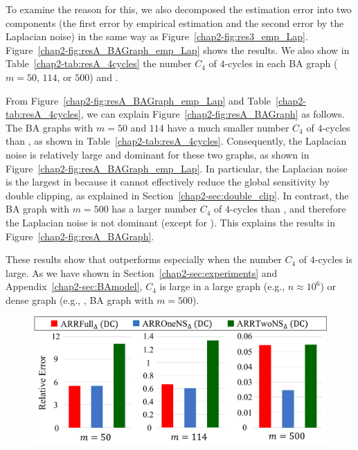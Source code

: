 {To examine the reason for this, we also decomposed the estimation error into two components (the first error by empirical estimation and the second error by the Laplacian noise) in the same way as Figure~\ref{chap2-fig:res3_emp_Lap}.
Figure~\ref{chap2-fig:resA_BAGraph_emp_Lap} shows the results.
We also show in Table~\ref{chap2-tab:resA_4cycles} the number $C_4$ of $4$-cycles in each BA graph ($m=50$, $114$, or $500$) and \GPlus{}.

From Figure~\ref{chap2-fig:resA_BAGraph_emp_Lap} and Table~\ref{chap2-tab:resA_4cycles}, we can explain Figure~\ref{chap2-fig:resA_BAGraph} as follows.
The BA graphs with $m=50$ and $114$ have a much smaller number $C_4$ of $4$-cycles than \GPlus{}, as shown in Table~\ref{chap2-tab:resA_4cycles}.
Consequently,
the Laplacian noise is relatively large and dominant for these two graphs, as shown in Figure~\ref{chap2-fig:resA_BAGraph_emp_Lap}.
In particular,
the Laplacian noise is the largest in \AlgThree{} because it cannot effectively reduce the global sensitivity by double clipping, as explained in Section~\ref{chap2-sec:double_clip}.
In contrast, the BA graph with $m=500$ has a larger number $C_4$ of $4$-cycles than \GPlus{}, and therefore the Laplacian noise is not dominant (except for \AlgThree{}).
This explains the results in Figure~\ref{chap2-fig:resA_BAGraph}.

These results
show that \AlgTwo{} outperforms \AlgOne{} especially when the number $C_4$ of $4$-cycles is large.
As we have shown in Section~\ref{chap2-sec:experiments} and Appendix~\ref{chap2-sec:BAmodel}, $C_4$ is large in a large graph (e.g., $n \approx 10^6$) or dense graph (e.g., \GPlus{}, BA graph with $m=500$).

\begin{figure}[t]
  \centering
  \includegraphics[width=0.99\linewidth]{fig/resA_BAGraph.pdf}
  

\end{figure}}
